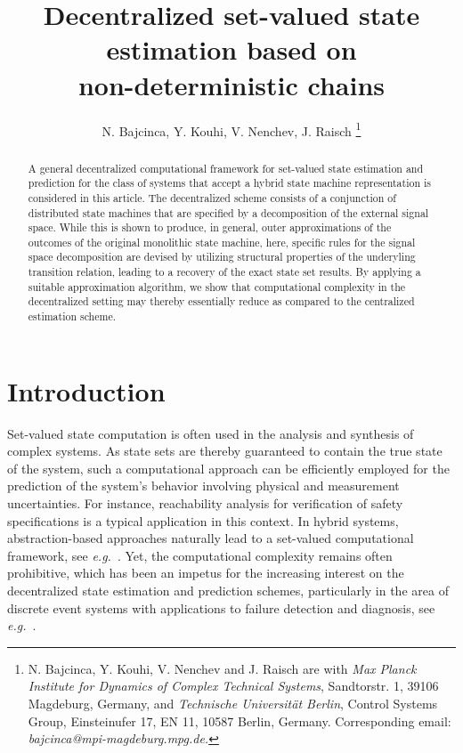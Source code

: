 \documentclass[a4paper, 10pt, conference]{ieeeconf}
\title{\LARGE \bf
Decentralized set-valued state estimation based on\\ non-deterministic chains}
\author{N. Bajcinca, Y. Kouhi, V. Nenchev, J. Raisch \thanks{N. Bajcinca, Y. Kouhi, V. Nenchev and J. Raisch are with \emph{Max Planck Institute for Dynamics of Complex Technical Systems}, Sandtorstr. 1, 39106 Magdeburg, Germany, and \emph{Technische Universit\"at Berlin}, Control Systems Group, Einsteinufer 17, EN 11, 10587 Berlin, Germany. Corresponding email: \footnotesize{\emph{bajcinca@mpi-magdeburg.mpg.de.}}}
}
\newcommand{\eg}{\emph{e.g.}~}
\begin{document}
\maketitle
\thispagestyle{empty}
\pagestyle{empty}



\begin{abstract}
A general decentralized computational framework for set-valued state estimation and prediction for the class of systems that accept a hybrid state machine representation is considered in this article. The decentralized scheme consists of a conjunction of distributed state machines that are specified by a decomposition of the external signal space.
While this is shown to produce, in general, outer approximations of the outcomes of the original monolithic state machine, here, specific rules for the signal space decomposition are devised by utilizing structural properties of the underyling transition relation, leading to a recovery of the exact state set results. By applying a suitable approximation algorithm, we show that computational complexity in the decentralized setting may thereby essentially reduce as compared to the centralized estimation scheme.











\end{abstract}






\section{Introduction}
\label{sec:introduction}
Set-valued state computation is often used in the analysis and synthesis of complex systems. As state sets are thereby guaranteed to contain the true state of the system, such a computational approach can be efficiently employed for the prediction of the system's behavior involving physical and measurement uncertainties. For instance, reachability analysis for verification of safety specifications is a typical application in this context. In hybrid systems, abstraction-based approaches naturally lead to a set-valued computational framework, see \eg \cite{Lunze2010}. Yet, the computational complexity remains often prohibitive, which has been an impetus for the increasing interest on the decentralized state estimation and prediction schemes, particularly in the area of discrete event systems with applications to failure detection and diagnosis, see \eg \cite{fabrecdc00, Xu2009}.
\end{document}
